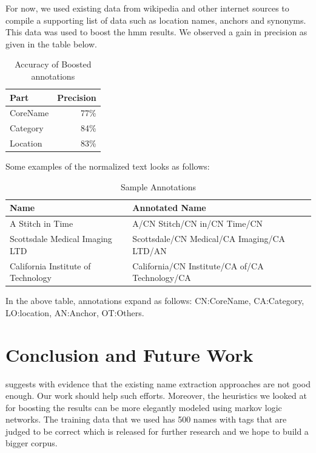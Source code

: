 \documentclass{acm_proc_article-sp}
\begin{document}
For now, we used existing data from wikipedia and other internet sources to compile a supporting list of data such as location names, anchors and synonyms. This data was used to boost the hmm results. We observed a gain in precision as given in the table  below.
\begin{table}[!ht]
\begin{center}
\begin{center}
  \begin{tabular}{ | l | r |}
    \hline
    Part & Precision \\ \hline 
    CoreName & 77\%  \\ \hline    
    Category & 84\% \\ \hline
    Location & 83\% \\ \hline 
  \end{tabular}
\end{center}
\end{center}
\caption{
Accuracy of Boosted annotations
}
\end{table}

Some examples of the normalized text looks as follows:
\begin{table}
\begin{center}
  \begin{tabular}{ |p{2cm} | p{3cm} |}
    \hline
    Name & Annotated Name \\ \hline
    A Stitch in Time & A/CN Stitch/CN in/CN Time/CN   \\ \hline
    Scottsdale Medical Imaging LTD & Scottsdale/CN Medical/CA Imaging/CA LTD/AN  \\ \hline
    California Institute of Technology & California/CN Institute/CA of/CA Technology/CA \\ \hline
  \end{tabular}
\end{center}
\caption{Sample Annotations}
\end{table}

In the above table, annotations expand as follows: 
CN:CoreName, CA:Category, LO:location,  AN:Anchor, OT:Others.

\section{Conclusion and Future Work}
\cite{Vilain:2007:EEB:1614108.1614154} suggests with evidence that the existing name extraction approaches are not good enough. Our work should help such efforts. Moreover, the heuristics we looked at for boosting the results can be more elegantly modeled using markov logic networks. The training data that we used has 500 names with tags that are judged to be correct which is released for further research and we hope to build a bigger corpus.
\end{document}
